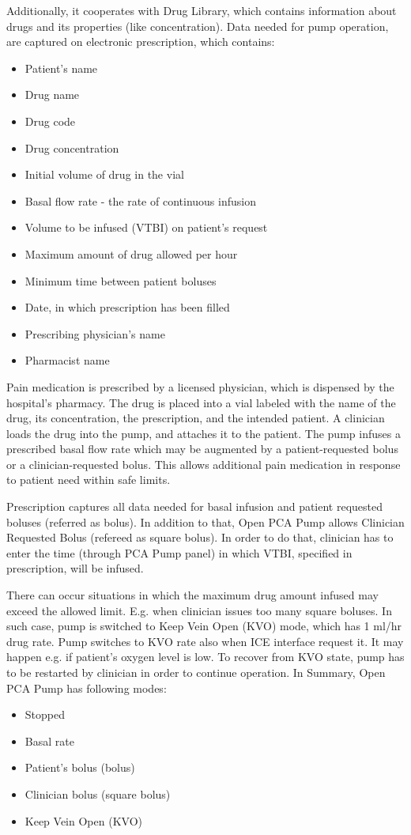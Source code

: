 Additionally, it cooperates with Drug Library, which contains information about drugs and its properties (like concentration). Data needed for pump operation, are captured on electronic prescription, which contains:
\begin{itemize}
    \item Patient's name
    \item Drug name
    \item Drug code
    \item Drug concentration
    \item Initial volume of drug in the vial
    \item Basal flow rate - the rate of continuous infusion
    \item Volume to be infused (VTBI) on patient's request
    \item Maximum amount of drug allowed per hour
    \item Minimum time between patient boluses
    \item Date, in which prescription has been filled
    \item Prescribing physician's name
    \item Pharmacist name
\end{itemize}

Pain medication is prescribed by a licensed physician, which is dispensed by the hospital's pharmacy. The drug is placed into a vial labeled with the name of the drug, its concentration, the prescription, and the intended patient. A clinician loads the drug into the pump, and attaches it to the patient. The pump infuses a prescribed basal flow rate which may be augmented by a patient-requested bolus or a clinician-requested bolus. This allows additional pain medication in response to patient need within safe limits. \cite{PcaReq}

Prescription captures all data needed for basal infusion and patient requested boluses (referred as bolus). In addition to that, Open PCA Pump allows Clinician Requested Bolus (refereed as square bolus). In order to do that, clinician has to enter the time (through PCA Pump panel) in which VTBI, specified in prescription, will be infused.

There can occur situations in which the maximum drug amount infused may exceed the allowed limit. E.g. when clinician issues too many square boluses. In such case, pump is switched to Keep Vein Open (KVO) mode, which has 1 ml/hr drug rate. Pump switches to KVO rate also when ICE interface request it. It may happen e.g. if patient's oxygen level is low. To recover from KVO state, pump has to be restarted by clinician in order to continue operation. In Summary, Open PCA Pump has following modes:
\begin{itemize}
    \item Stopped
    \item Basal rate
    \item Patient's bolus (bolus)
    \item Clinician bolus (square bolus)
    \item Keep Vein Open (KVO)
\end{itemize}

